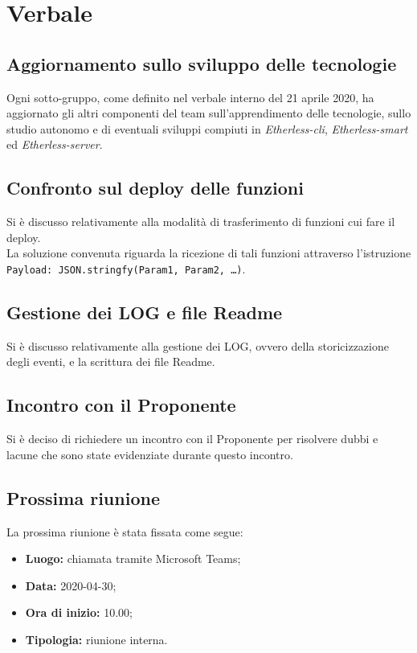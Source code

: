 \section{Verbale}

	\subsection{Aggiornamento sullo sviluppo delle tecnologie}
		Ogni sotto-gruppo, come definito nel verbale interno del 21 aprile 2020, ha aggiornato gli altri componenti del team sull'apprendimento delle tecnologie, sullo studio autonomo e di eventuali sviluppi compiuti in \textit{Etherless-cli}, \textit{Etherless-smart} ed \textit{Etherless-server}. 
	
	\subsection{Confronto sul deploy delle funzioni}
		Si è discusso relativamente alla modalità di trasferimento di funzioni cui fare il deploy.\\
		La soluzione convenuta riguarda la ricezione di tali funzioni attraverso l'istruzione \texttt{Payload: JSON.stringfy(Param1, Param2, …)}.
		
	\subsection{Gestione dei LOG e file Readme}
		Si è discusso relativamente alla gestione dei LOG, ovvero della storicizzazione degli eventi, e la scrittura dei file Readme.
	
	\subsection{Incontro con il Proponente}
		Si è deciso di richiedere un incontro con il Proponente per risolvere dubbi e lacune che sono state evidenziate durante questo incontro.
	
	\subsection{Prossima riunione}
		La prossima riunione è stata fissata come segue:
		\begin{itemize}
			\item \textbf{Luogo: } chiamata tramite Microsoft Teams; 
			\item \textbf{Data: } 2020-04-30;
			\item \textbf{Ora di inizio: } 10.00;
			\item \textbf{Tipologia: } riunione interna.
		\end{itemize}

